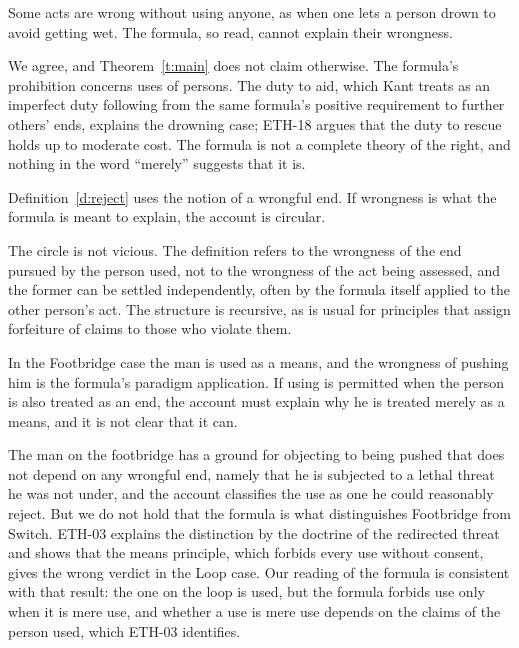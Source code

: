 \documentclass{situationist-preprint}
\begin{document}
\begin{objection}[Necessity]\label{o:necessity}
Some acts are wrong without using anyone, as when one lets a person drown to avoid getting wet. The formula, so read, cannot explain their wrongness.
\end{objection}

\begin{reply}
We agree, and Theorem~\ref{t:main} does not claim otherwise. The formula's prohibition concerns uses of persons. The duty to aid, which Kant treats as an imperfect duty following from the same formula's positive requirement to further others' ends, explains the drowning case; ETH-18 argues that the duty to rescue holds up to moderate cost. The formula is not a complete theory of the right, and nothing in the word \enquote{merely} suggests that it is.
\end{reply}

\begin{objection}[Circularity]\label{o:circ}
Definition~\ref{d:reject} uses the notion of a wrongful end. If wrongness is what the formula is meant to explain, the account is circular.
\end{objection}

\begin{reply}
The circle is not vicious. The definition refers to the wrongness of the end pursued by the person used, not to the wrongness of the act being assessed, and the former can be settled independently, often by the formula itself applied to the other person's act. The structure is recursive, as is usual for principles that assign forfeiture of claims to those who violate them.
\end{reply}

\begin{objection}\label{o:trolley}
In the Footbridge case the man is used as a means, and the wrongness of pushing him is the formula's paradigm application. If using is permitted when the person is also treated as an end, the account must explain why he is treated merely as a means, and it is not clear that it can.
\end{objection}

\begin{reply}
The man on the footbridge has a ground for objecting to being pushed that does not depend on any wrongful end, namely that he is subjected to a lethal threat he was not under, and the account classifies the use as one he could reasonably reject. But we do not hold that the formula is what distinguishes Footbridge from Switch. ETH-03 explains the distinction by the doctrine of the redirected threat and shows that the means principle, which forbids every use without consent, gives the wrong verdict in the Loop case. Our reading of the formula is consistent with that result: the one on the loop is used, but the formula forbids use only when it is mere use, and whether a use is mere use depends on the claims of the person used, which ETH-03 identifies.
\end{reply}
\end{document}
